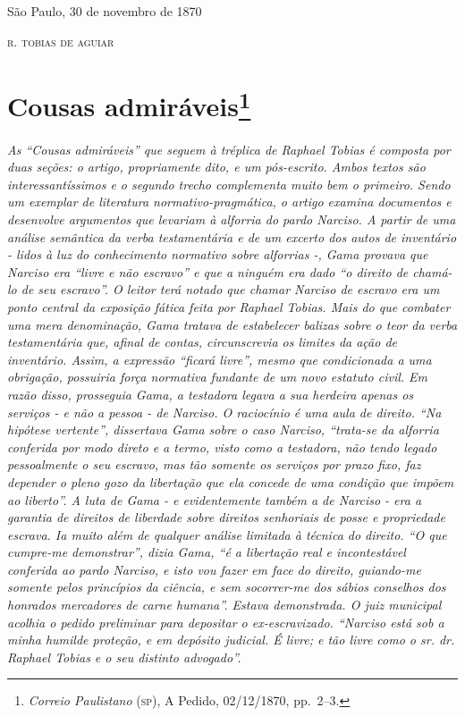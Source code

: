 \begin{flushright}
São Paulo, 30 de novembro de 1870

\textsc{r. tobias de aguiar}
\end{flushright}

\chapter{Cousas admiráveis\footnote{\emph{Correio Paulistano} (\textsc{sp}), A Pedido, 02/12/1870,
  pp.~2--3.}} %

\begin{didascalia}
\emph{As ``Cousas admiráveis'' que seguem à tréplica de Raphael Tobias é
composta por duas seções: o artigo, propriamente dito, e um pós-escrito.
Ambos textos são interessantíssimos e o segundo trecho complementa muito
bem o primeiro. Sendo um exemplar de literatura normativo-pragmática, o
artigo examina documentos e desenvolve argumentos que levariam à
alforria do pardo Narciso. A partir de uma análise semântica da verba
testamentária e de um excerto dos autos de inventário - lidos à luz do
conhecimento normativo sobre alforrias -, Gama provava que Narciso era
``livre e não escravo'' e que a ninguém era dado ``o direito de chamá-lo de
seu escravo''. O leitor terá notado que chamar Narciso de escravo era um
ponto central da exposição fática feita por Raphael Tobias. Mais do que
combater uma mera denominação, Gama tratava de estabelecer balizas sobre
o teor da verba testamentária que, afinal de contas, circunscrevia os
limites da ação de inventário. Assim, a expressão ``ficará livre'', mesmo
que condicionada a uma obrigação, possuiria força normativa fundante de
um novo estatuto civil. Em razão disso, prosseguia Gama, a testadora
legava a sua herdeira apenas os serviços - e não a pessoa - de Narciso.
O raciocínio é uma aula de direito. ``Na hipótese vertente'', dissertava
Gama sobre o caso Narciso, ``trata-se da alforria conferida por modo
direto e a termo, visto como a testadora, não tendo legado pessoalmente
o seu escravo, mas tão somente os serviços por prazo fixo, faz depender
o pleno gozo da libertação que ela concede de uma condição que impõem ao
liberto''. A luta de Gama - e evidentemente também a de Narciso - era a
garantia de direitos de liberdade sobre direitos senhoriais de posse e
propriedade escrava. Ia muito além de qualquer análise limitada à
técnica do direito. ``O que cumpre-me demonstrar'', dizia Gama, ``é a
libertação real e incontestável conferida ao pardo Narciso, e isto vou
fazer em face do direito, guiando-me somente pelos princípios da
ciência, e sem socorrer-me dos sábios conselhos dos honrados mercadores
de carne humana''. Estava demonstrada. O juiz municipal acolhia o pedido
preliminar para depositar o ex-escravizado. ``Narciso está sob a minha
humilde proteção, e em depósito judicial. É livre; e tão livre como o
sr. dr. Raphael Tobias e o seu distinto advogado''.}
\end{didascalia}

